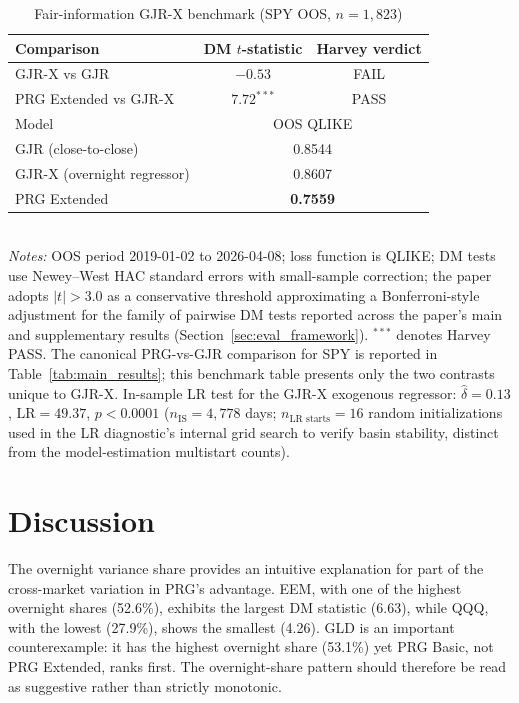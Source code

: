 \documentclass[11pt,a4paper]{article}
\begin{document}
\begin{table}[ht]
\centering
\caption{Fair-information GJR-X benchmark (SPY OOS, $n=1{,}823$)}
\label{tab:gjrx}
\small
\begin{tabular}{lcc}
\toprule
Comparison & DM $t$-statistic & Harvey verdict \\
\midrule
GJR-X vs GJR          & $-0.53$       & FAIL \\
PRG Extended vs GJR-X & $7.72^{***}$  & PASS \\
\midrule
\multicolumn{1}{l}{Model} & \multicolumn{2}{c}{OOS QLIKE} \\
\midrule
GJR (close-to-close)        & \multicolumn{2}{c}{0.8544} \\
GJR-X (overnight regressor) & \multicolumn{2}{c}{0.8607} \\
PRG Extended                & \multicolumn{2}{c}{\textbf{0.7559}} \\
\bottomrule
\end{tabular}
\\[4pt]
\emph{Notes:} OOS period 2019-01-02 to 2026-04-08; loss function is QLIKE; DM tests use Newey--West HAC standard errors with \citet{Harvey1997} small-sample correction; the paper adopts $|t|>3.0$ as a conservative threshold approximating a Bonferroni-style adjustment for the family of pairwise DM tests reported across the paper's main and supplementary results (Section~\ref{sec:eval_framework}). ${}^{***}$ denotes Harvey PASS. The canonical PRG-vs-GJR comparison for SPY is reported in Table~\ref{tab:main_results}; this benchmark table presents only the two contrasts unique to GJR-X. In-sample LR test for the GJR-X exogenous regressor: $\hat{\delta}=0.13$, $\mathrm{LR}=49.37$, $p<0.0001$ ($n_{\text{IS}}=4{,}778$ days; $n_{\text{LR starts}}=16$ random initializations used in the LR diagnostic's internal grid search to verify basin stability, distinct from the model-estimation multistart counts).
\end{table}


\section{Discussion}

The overnight variance share provides an intuitive explanation for part of the cross-market variation in PRG's advantage. EEM, with one of the highest overnight shares (52.6\%), exhibits the largest DM statistic (6.63), while QQQ, with the lowest (27.9\%), shows the smallest (4.26). GLD is an important counterexample: it has the highest overnight share (53.1\%) yet PRG Basic, not PRG Extended, ranks first. The overnight-share pattern should therefore be read as suggestive rather than strictly monotonic.
\end{document}
